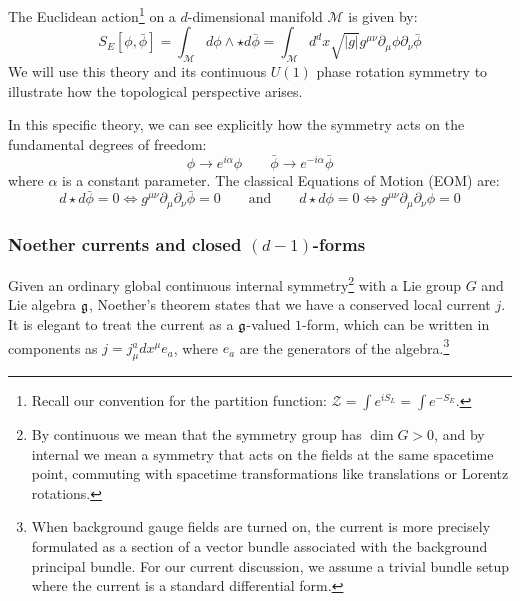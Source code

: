 \documentclass[aps,preprint,nofootinbib,preprintnumbers,eqsecnum,superscriptaddress]{revtex4}
\numberwithin{equation}{section}
\begin{document}
\begin{tcolorbox}[colback=green!5!white, colframe=green!75!black, title={Example: Complex scalar boson in general dimension}]


The Euclidean action\footnote{Recall our convention for the partition function: $\mathcal{Z} = \int e^{iS_L} = \int e^{-S_E}$.} on a $d$-dimensional manifold $\mathcal{M}$ is given by:
\begin{equation}
    S_E [\phi, \bar \phi] = \int_\mathcal{M} d \phi \wedge \star d \bar \phi = \int_\mathcal{M} d^d x \sqrt{|g|} g^{\mu \nu} \partial_\mu \phi \partial_\nu \bar \phi 
\end{equation}
We will use this theory and its continuous $U(1)$ phase rotation symmetry to illustrate how the topological perspective arises.
\end{tcolorbox}

In this specific theory, we can see explicitly how the symmetry acts on the fundamental degrees of freedom:
\begin{equation}
\phi \to e^{i\alpha}\phi \qquad \bar \phi \to e^{-i\alpha} \bar\phi
\end{equation}
where $\alpha$ is a constant parameter. The classical Equations of Motion (EOM) are:
\begin{equation}
d \star d \bar \phi = 0 \iff g^{\mu \nu}\partial_\mu \partial_\nu \bar \phi = 0  \qquad \text{and} \qquad d \star d \phi = 0 \iff g^{\mu \nu}\partial_\mu \partial_\nu \phi = 0
\end{equation}

\subsubsection{Noether currents and closed $(d-1)$-forms}

Given an ordinary global continuous internal symmetry\footnote{By continuous we mean that the symmetry group has $\dim G > 0$, and by internal we mean a symmetry that acts on the fields at the same spacetime point, commuting with spacetime transformations like translations or Lorentz rotations.} with a Lie group $G$ and Lie algebra $\frak{g}$, Noether's theorem \cite{Noether1918, Noether_1971} states that we have a conserved local current $j$. It is elegant to treat the current as a $\frak{g}$-valued $1$-form, which can be written in components as $j = j^a_\mu dx^\mu e_a$, where $e_a$ are the generators of the algebra.\footnote{When background gauge fields are turned on, the current is more precisely formulated as a section of a vector bundle associated with the background principal bundle. For our current discussion, we assume a trivial bundle setup where the current is a standard differential form.}
\end{document}
